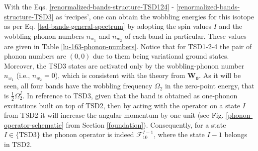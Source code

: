 With the Eqs. \ref{renormalized-bands-structure-TSD124} - \ref{renormalized-bands-structure-TSD3} as `recipes', one can obtain the wobbling energies for this isotope as per Eq. \ref{tsd-bands-general-spectrum} by adopting the spin values $I$ and the wobbling phonon numbers $n_{w_1}$ and $n_{w_2}$ of each band in particular. These values are given in Table \ref{lu-163-phonon-numbers}. Notice that for TSD1-2-4 the pair of phonon numbers are $(0,0)$ due to them being variational ground states. Moreover, the TSD3 states are activated only by the wobbling-phonon number $n_{w_1}$ (i.e., $n_{w_2}=0$), which is consistent with the theory from $\mathbf{W_0}$. As it will be seen, all four bands have the wobbling frequency $\Omega_2$ in the zero-point energy, that is $\frac{1}{2}\Omega_2^I$. In reference to TSD3, given that the band is obtained as one-phonon excitations built on top of TSD2, then by acting with the operator on a state $I$ from TSD2 it will increase the angular momentum by one unit (see Fig. \ref{phonon-operator-schematic} from Section \ref{foundation}). Consequently, for a state $I\in\{\text{TSD3}\}$ the phonon operator is indeed $\mathcal{F}_{10}^{I-1}$, where the state $I-1$ belongs in TSD2.
\begin{table}
    \centering
    \caption{The wobbling phonon numbers of $^{163}$Lu that correspond to the phonon frequencies $\Omega_1$ and $\Omega_2$, respectively (see Eq. \ref{phononic-term-tsd-energies}). For completeness the first ($I_0$) and last ($I_t$ for \emph{terminus}) spin states of each band are given. The quasi-particles involved in the particle + rotor coupling are denoted according to Eqs. \ref{renormalized-bands-structure-TSD124} - \ref{renormalized-bands-structure-TSD3}. See text for the $\mathcal{F}_{10}^{I-1}$ term.}
    \label{lu-163-phonon-numbers}
\end{table}

